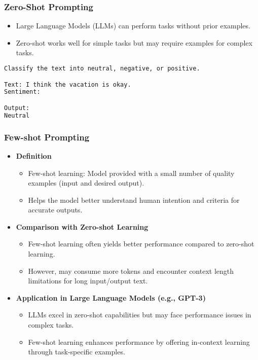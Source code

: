 \begin{frame}[fragile]\frametitle{Zero-Shot Prompting}
    \begin{itemize}
        \item Large Language Models (LLMs) can perform tasks without prior examples.
        \item Zero-shot works well for simple tasks but may require examples for complex tasks.
    \end{itemize}
	
\begin{lstlisting}[language=HTML]
Classify the text into neutral, negative, or positive. 

Text: I think the vacation is okay.
Sentiment:

Output:
Neutral
\end{lstlisting}
\end{frame}


\begin{frame}[fragile]\frametitle{Few-shot Prompting}

\begin{itemize}
  \item \textbf{Definition}
    \begin{itemize}
      \item Few-shot learning: Model provided with a small number of quality examples (input and desired output).
      \item Helps the model better understand human intention and criteria for accurate outputs.
    \end{itemize}

  \item \textbf{Comparison with Zero-shot Learning}
    \begin{itemize}
      \item Few-shot learning often yields better performance compared to zero-shot learning.
      \item However, may consume more tokens and encounter context length limitations for long input/output text.
    \end{itemize}

  \item \textbf{Application in Large Language Models (e.g., GPT-3)}
    \begin{itemize}
      \item LLMs excel in zero-shot capabilities but may face performance issues in complex tasks.
      \item Few-shot learning enhances performance by offering in-context learning through task-specific examples.
    \end{itemize}

\end{itemize}

\end{frame}

